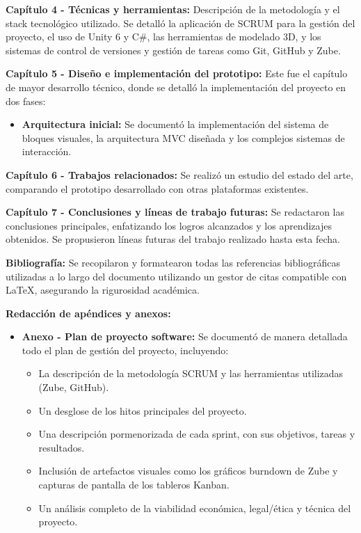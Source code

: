 	\item \textbf{Capítulo 4 - Técnicas y herramientas:} Descripción de la metodología y el stack tecnológico utilizado. Se detalló la aplicación de SCRUM para la gestión del proyecto, el uso de Unity 6 y C\#, las herramientas de modelado 3D, y los sistemas de control de versiones y gestión de tareas como Git, GitHub y Zube.
	
	\item \textbf{Capítulo 5 - Diseño e implementación del prototipo:} Este fue el capítulo de mayor desarrollo técnico, donde se detalló la implementación del proyecto en dos fases:
	\begin{itemize}
		\item \textbf{Arquitectura inicial:} Se documentó la implementación del sistema de bloques visuales, la arquitectura MVC diseñada y los complejos sistemas de interacción.
	
	\end{itemize}
	
	\item \textbf{Capítulo 6 - Trabajos relacionados:} Se realizó un estudio del estado del arte, comparando el prototipo desarrollado con otras plataformas existentes.
	
	\item \textbf{Capítulo 7 - Conclusiones y líneas de trabajo futuras:} Se redactaron las conclusiones principales, enfatizando los logros alcanzados y los aprendizajes obtenidos. Se propusieron líneas futuras del trabajo realizado hasta esta fecha.
	
	\item \textbf{Bibliografía:} Se recopilaron y formatearon todas las referencias bibliográficas utilizadas a lo largo del documento utilizando un gestor de citas compatible con LaTeX, asegurando la rigurosidad académica.


\item \textbf{Redacción de apéndices y anexos:}
\begin{itemize}
	\item \textbf{Anexo - Plan de proyecto software:} Se documentó de manera detallada todo el plan de gestión del proyecto, incluyendo:
	\begin{itemize}
		\item La descripción de la metodología SCRUM y las herramientas utilizadas (Zube, GitHub).
		\item Un desglose de los hitos principales del proyecto.
		\item Una descripción pormenorizada de cada sprint, con sus objetivos, tareas y resultados.
		\item Inclusión de artefactos visuales como los gráficos burndown de Zube y capturas de pantalla de los tableros Kanban.
		\item Un análisis completo de la viabilidad económica, legal/ética y técnica del proyecto.
	\end{itemize}
\end{itemize}

